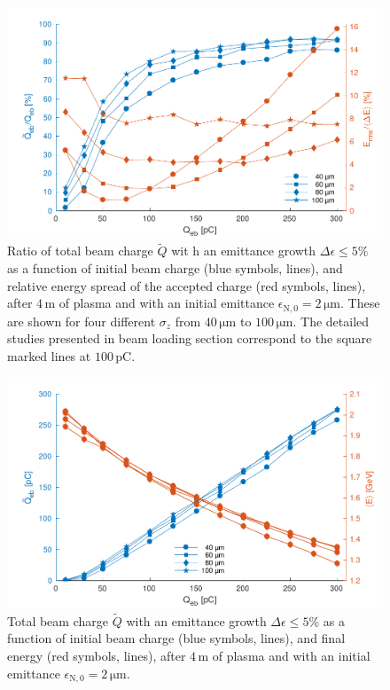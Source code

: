 \documentclass[aps,prstab,reprint,amsmath,amssymb,groupedaddress]{revtex4-1}
\newcommand{\unit}[1]{\,\mathrm{#1}}
\begin{document}
\begin{figure}[hbt]
    \includegraphics[width=\linewidth,trim={2mm 0mm 2mm 0mm},clip]{figures/beamQuality}
    \caption{\label{Fig:BeamQ} Ratio of total beam charge $\widetilde{Q}$ wit h an emittance growth
        $\Delta\epsilon \leq 5\%$ as a function of initial beam charge (blue symbols, lines), and relative energy spread
        of the accepted charge (red symbols, lines), after $4\unit{m}$ of plasma and with an initial emittance
        $\epsilon_{\mathrm{N},0}=2\unit{\mu m}$. These are shown for four different $\sigma_{z}$ from $40\unit{\mu m}$
        to $100\unit{\mu m}$. The detailed studies presented in beam loading section correspond to the square marked
        lines at $100\unit{pC}$.}
\end{figure}

\begin{figure}[hbt]
    \includegraphics[width=\linewidth,trim={2mm 0mm 2mm 0mm},clip]{figures/beamQualityAbs}
    \caption{\label{Fig:BeamQAbs} Total beam charge $\widetilde{Q}$ with an emittance growth $\Delta\epsilon \leq 5\%${}
        as a function of initial beam charge (blue symbols, lines), and final energy (red symbols, lines), after
        $4\unit{m}$ of plasma and with an initial emittance $\epsilon_{\mathrm{N},0}=2\unit{\mu m}$.}
\end{figure}
\end{document}

